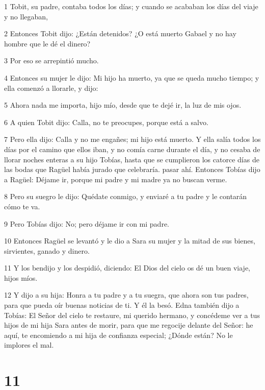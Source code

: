 \par 1 Tobit, su padre, contaba todos los días; y cuando se acababan los días del viaje y no llegaban,
\par 2 Entonces Tobit dijo: ¿Están detenidos? ¿O está muerto Gabael y no hay hombre que le dé el dinero?
\par 3 Por eso se arrepintió mucho.
\par 4 Entonces su mujer le dijo: Mi hijo ha muerto, ya que se queda mucho tiempo; y ella comenzó a llorarle, y dijo:
\par 5 Ahora nada me importa, hijo mío, desde que te dejé ir, la luz de mis ojos.
\par 6 A quien Tobit dijo: Calla, no te preocupes, porque está a salvo.
\par 7 Pero ella dijo: Calla y no me engañes; mi hijo está muerto. Y ella salía todos los días por el camino que ellos iban, y no comía carne durante el día, y no cesaba de llorar noches enteras a su hijo Tobías, hasta que se cumplieron los catorce días de las bodas que Ragüel había jurado que celebraría. pasar ahí. Entonces Tobías dijo a Ragüel: Déjame ir, porque mi padre y mi madre ya no buscan verme.
\par 8 Pero su suegro le dijo: Quédate conmigo, y enviaré a tu padre y le contarán cómo te va.
\par 9 Pero Tobías dijo: No; pero déjame ir con mi padre.
\par 10 Entonces Ragüel se levantó y le dio a Sara su mujer y la mitad de sus bienes, sirvientes, ganado y dinero.
\par 11 Y los bendijo y los despidió, diciendo: El Dios del cielo os dé un buen viaje, hijos míos.
\par 12 Y dijo a su hija: Honra a tu padre y a tu suegra, que ahora son tus padres, para que pueda oír buenas noticias de ti. Y él la besó. Edna también dijo a Tobías: El Señor del cielo te restaure, mi querido hermano, y concédeme ver a tus hijos de mi hija Sara antes de morir, para que me regocije delante del Señor: he aquí, te encomiendo a mi hija de confianza especial; ¿Dónde están? No le implores el mal.

\chapter{11}

